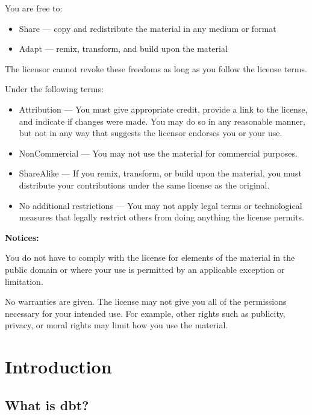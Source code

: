 \documentclass[
]{book}
\begin{document}
You are free to:

\begin{itemize}
\item
  Share --- copy and redistribute the material in any medium or format
\item
  Adapt --- remix, transform, and build upon the material
\end{itemize}

The licensor cannot revoke these freedoms as long as you follow the license terms.

Under the following terms:

\begin{itemize}
\item
  Attribution --- You must give appropriate credit, provide a link to the license, and indicate if changes were made. You may do so in any reasonable manner, but not in any way that suggests the licensor endorses you or your use.
\item
  NonCommercial --- You may not use the material for commercial purposes.
\item
  ShareAlike --- If you remix, transform, or build upon the material, you must distribute your contributions under the same license as the original.
\item
  No additional restrictions --- You may not apply legal terms or technological measures that legally restrict others from doing anything the license permits.
\end{itemize}

\textbf{Notices:}

You do not have to comply with the license for elements of the material in the public domain or where your use is permitted by an applicable exception or limitation.

No warranties are given. The license may not give you all of the permissions necessary for your intended use. For example, other rights such as publicity, privacy, or moral rights may limit how you use the material.

\hypertarget{introduction}{%
\chapter{Introduction}\label{introduction}}

\hypertarget{what-is-dbt}{%
\section{What is dbt?}\label{what-is-dbt}}
\end{document}
